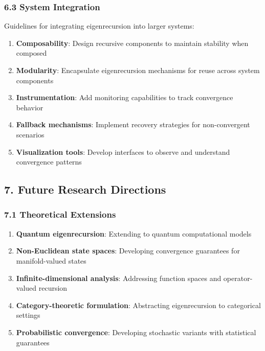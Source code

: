 \documentclass[
]{article}
\providecommand{\tightlist}{%
  \setlength{\itemsep}{0pt}\setlength{\parskip}{0pt}}
\begin{document}
\subsubsection{6.3 System Integration}\label{system-integration}

Guidelines for integrating eigenrecursion into larger systems:

\begin{enumerate}
\def\labelenumi{\arabic{enumi}.}
\tightlist
\item
  \textbf{Composability}: Design recursive components to maintain
  stability when composed
\item
  \textbf{Modularity}: Encapsulate eigenrecursion mechanisms for reuse
  across system components
\item
  \textbf{Instrumentation}: Add monitoring capabilities to track
  convergence behavior
\item
  \textbf{Fallback mechanisms}: Implement recovery strategies for
  non-convergent scenarios
\item
  \textbf{Visualization tools}: Develop interfaces to observe and
  understand convergence patterns
\end{enumerate}

\subsection{7. Future Research
Directions}\label{future-research-directions}

\subsubsection{7.1 Theoretical Extensions}\label{theoretical-extensions}

\begin{enumerate}
\def\labelenumi{\arabic{enumi}.}
\tightlist
\item
  \textbf{Quantum eigenrecursion}: Extending to quantum computational
  models
\item
  \textbf{Non-Euclidean state spaces}: Developing convergence guarantees
  for manifold-valued states
\item
  \textbf{Infinite-dimensional analysis}: Addressing function spaces and
  operator-valued recursion
\item
  \textbf{Category-theoretic formulation}: Abstracting eigenrecursion to
  categorical settings
\item
  \textbf{Probabilistic convergence}: Developing stochastic variants
  with statistical guarantees
\end{enumerate}
\end{document}
